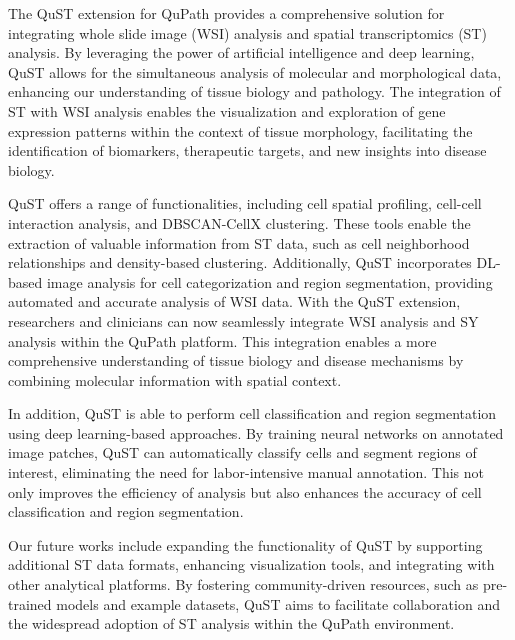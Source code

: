 \documentclass{article}
\begin{document}
The QuST extension for QuPath provides a comprehensive solution for integrating whole slide image (WSI) analysis and spatial transcriptomics (ST) analysis. By leveraging the power of artificial intelligence and deep learning, QuST allows for the simultaneous analysis of molecular and morphological data, enhancing our understanding of tissue biology and pathology. The integration of ST with WSI analysis enables the visualization and exploration of gene expression patterns within the context of tissue morphology, facilitating the identification of biomarkers, therapeutic targets, and new insights into disease biology.

QuST offers a range of functionalities, including cell spatial profiling, cell-cell interaction analysis, and DBSCAN-CellX clustering. These tools enable the extraction of valuable information from ST data, such as cell neighborhood relationships and density-based clustering. Additionally, QuST incorporates DL-based image analysis for cell categorization and region segmentation, providing automated and accurate analysis of WSI data. With the QuST extension, researchers and clinicians can now seamlessly integrate WSI analysis and SY analysis within the QuPath platform. This integration enables a more comprehensive understanding of tissue biology and disease mechanisms by combining molecular information with spatial context.

In addition, QuST is able to perform cell classification and region segmentation using deep learning-based approaches. By training neural networks on annotated image patches, QuST can automatically classify cells and segment regions of interest, eliminating the need for labor-intensive manual annotation. This not only improves the efficiency of analysis but also enhances the accuracy of cell classification and region segmentation.


Our future works include expanding the functionality of QuST by supporting additional ST data formats, enhancing visualization tools, and integrating with other analytical platforms. By fostering community-driven resources, such as pre-trained models and example datasets, QuST aims to facilitate collaboration and the widespread adoption of ST analysis within the QuPath environment.
\end{document}

